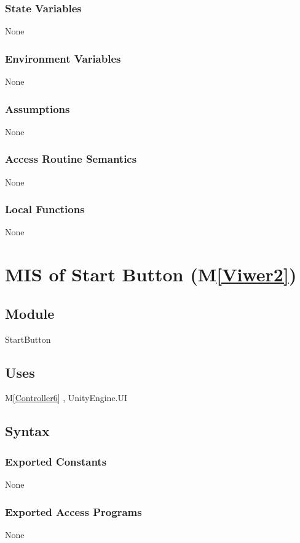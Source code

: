 \documentclass[12pt, titlepage]{article}
\newcommand{\mref}[1]{M\ref{#1}}
\begin{document}
\subsubsection{State Variables}
None
\subsubsection{Environment Variables}
None
\subsubsection{Assumptions}
None
\subsubsection{Access Routine Semantics}
None
\subsubsection{Local Functions}
None


\newpage


\renewcommand{\bref}{\href{https://docs.unity3d.com/Packages/com.unity.ugui@1.0/manual/script-Button.html}{here}}

\section{MIS of Start Button (\mref{Viwer2})}

\subsection{Module}
StartButton

\subsection{Uses}
\mref{Controller6} , 
UnityEngine.UI

\subsection{Syntax}
\subsubsection{Exported Constants}
None
\subsubsection{Exported Access Programs}
None
\end{document}
